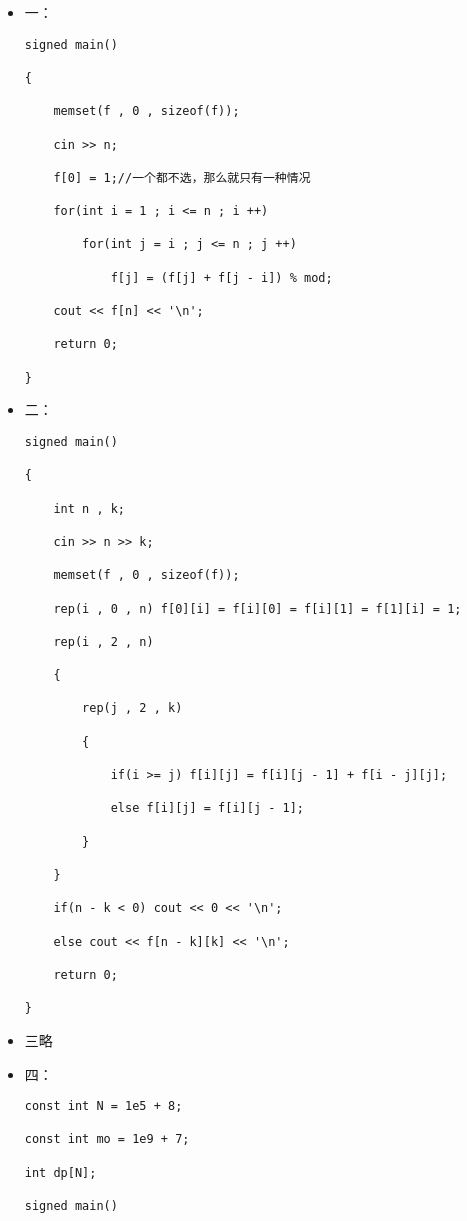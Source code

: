 \documentclass[E:/GsjzTle/main/main.tex]{subfiles}
\begin{document}
\begin{itemize}
\item
  一：

\begin{lstlisting}
signed main()

{

	memset(f , 0 , sizeof(f));

	cin >> n;

	f[0] = 1;//一个都不选，那么就只有一种情况 

	for(int i = 1 ; i <= n ; i ++)

		for(int j = i ; j <= n ; j ++)

			f[j] = (f[j] + f[j - i]) % mod;

	cout << f[n] << '\n';

	return 0;

}
\end{lstlisting}
\item
  二：

\begin{lstlisting}
signed main()

{

	int n , k;

	cin >> n >> k;

	memset(f , 0 , sizeof(f));

	rep(i , 0 , n) f[0][i] = f[i][0] = f[i][1] = f[1][i] = 1; 

	rep(i , 2 , n)

	{

		rep(j , 2 , k)

		{

			if(i >= j) f[i][j] = f[i][j - 1] + f[i - j][j];

			else f[i][j] = f[i][j - 1];

		}

	}

	if(n - k < 0) cout << 0 << '\n';

	else cout << f[n - k][k] << '\n';

	return 0;

}
\end{lstlisting}
\item
  三略
\item
  四：

\begin{lstlisting}
const int N = 1e5 + 8;

const int mo = 1e9 + 7;

int dp[N];

signed main()


\end{lstlisting}
\end{itemize}
\end{document}
